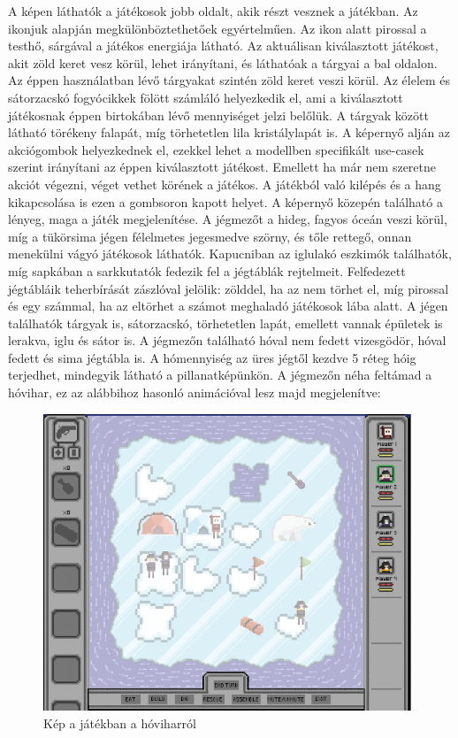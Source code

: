A képen láthatók a játékosok jobb oldalt, akik részt vesznek a játékban. Az ikonjuk alapján megkülönböztethetőek egyértelműen. Az ikon alatt pirossal a testhő, sárgával a játékos energiája látható.
Az aktuálisan kiválasztott játékost, akit zöld keret vesz körül, lehet irányítani, és láthatóak a tárgyai a bal oldalon. Az éppen használatban lévő tárgyakat szintén zöld keret veszi körül. Az élelem és sátorzacskó fogyócikkek fölött számláló helyezkedik el, ami a kiválasztott játékosnak éppen birtokában lévő mennyiséget jelzi belőlük. A tárgyak között látható törékeny falapát, míg törhetetlen lila kristálylapát is.
A képernyő alján az akciógombok helyezkednek el, ezekkel lehet a modellben specifikált use-casek szerint irányítani az éppen kiválasztott játékost. Emellett ha már nem szeretne akciót végezni, véget vethet körének a játékos. A játékból való kilépés és a hang kikapcsolása is ezen a gombsoron kapott helyet.
A képernyő közepén található a lényeg, maga a játék megjelenítése. A jégmezőt a hideg, fagyos óceán veszi körül, míg a tükörsima jégen félelmetes jegesmedve szörny, és tőle rettegő, onnan menekülni vágyó játékosok láthatók. Kapucniban az iglulakó eszkimók találhatók, míg sapkában a sarkkutatók fedezik fel a jégtáblák rejtelmeit. Felfedezett jégtábláik teherbírását zászlóval jelölik: zölddel, ha az nem törhet el, míg pirossal és egy számmal, ha az eltörhet a számot meghaladó játékosok lába alatt.
A jégen találhatók tárgyak is, sátorzacskó, törhetetlen lapát, emellett vannak épületek is lerakva, iglu és sátor is.
A jégmezőn található hóval nem fedett vizesgödör, hóval fedett és sima jégtábla is. A hómennyiség az üres jégtől kezdve 5 réteg hóig terjedhet, mindegyik látható a pillanatképünkön.
A jégmezőn néha feltámad a hóvihar, ez az alábbihoz hasonló animációval lesz majd megjelenítve:

\begin{figure}[H]
	\begin{center}
		\includegraphics[width=11cm]{chapters/chapter11/res/storm.png}
		\caption{Kép a játékban a hóviharról}
		\label{fig:Snowstorm}
	\end{center}
\end{figure}

